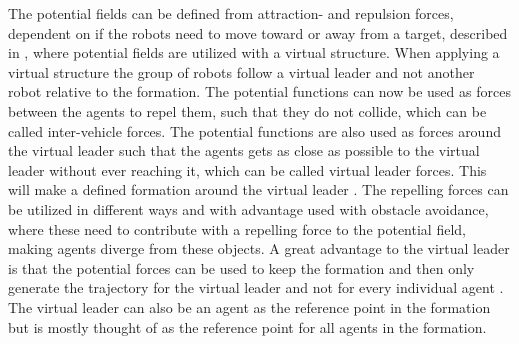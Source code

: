 The potential fields can be defined from attraction- and repulsion forces, dependent on if the robots need to move toward or away from a target, described in \citep{pfmrm}, where potential fields are utilized with a virtual structure. When applying a virtual structure the group of robots follow a virtual leader and not another robot relative to the formation. The potential functions can now be used as forces between the agents to repel them, such that they do not collide, which can be called inter-vehicle forces. The potential functions are also used as forces around the virtual leader such that the agents gets as close as possible to the virtual leader without ever reaching it, which can be called virtual leader forces. This will make a defined formation around the virtual leader \citep{1655803}. The repelling forces can be utilized in different ways and with advantage used with obstacle avoidance, where these need to contribute with a repelling force to the potential field, making agents diverge from these objects. A great advantage to the virtual leader is that the potential forces can be used to keep the formation and then only generate the trajectory for the virtual leader and not for every individual agent \citep{1655803}. The virtual leader can also be an agent as the reference point in the formation but is mostly thought of as the reference point for all agents in the formation.

